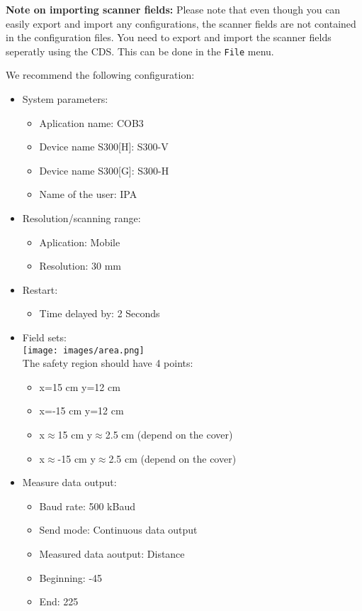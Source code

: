 \textbf{Note on importing scanner fields:}
Please note that even though you can easily export and import any configurations, the scanner fields are not contained in the configuration files.
You need to export and import the scanner fields seperatly using the CDS.
This can be done in the \texttt{File} menu.

We recommend the following configuration:
\begin{itemize}
\item System parameters:
\begin{itemize}
\item Aplication name: COB3
\item Device name S300[H]: S300-V
\item Device name S300[G]: S300-H
\item Name of the user: IPA
\end{itemize}
\item Resolution/scanning range:
\begin{itemize}
\item Aplication: Mobile
\item Resolution: 30 mm
\end{itemize}
\item Restart:
\begin{itemize}
\item Time delayed by: 2 Seconds
\end{itemize}
\item Field sets:
\\
\texttt{[image: images/area.png]}
\\ The safety region should have 4 points:
\begin{itemize}
\item x=15 cm y=12 cm
\item x=-15 cm y=12 cm
\item x$\approx$15 cm y$\approx$2.5 cm (depend on the cover)
\item x$\approx$-15 cm y$\approx$2.5 cm (depend on the cover)
\end{itemize}
\item Measure data output:
\begin{itemize}
\item Baud rate: 500 kBaud
\item Send mode: Continuous data output
\item Measured data aoutput: Distance
\item Beginning: -45
\item End: 225
\end{itemize}
\end{itemize}

